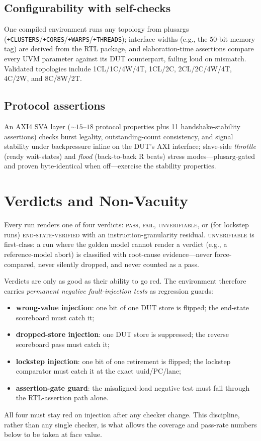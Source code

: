 \documentclass[conference]{IEEEtran}
\newcommand{\code}[1]{\texttt{\small #1}}
\begin{document}
\subsection{Configurability with self-checks}
One compiled environment runs any topology from plusargs
(\code{+CLUSTERS}/\code{+CORES}/\code{+WARPS}/\code{+THREADS});
interface widths (e.g., the 50-bit memory tag) are derived from the RTL
package, and elaboration-time assertions compare every UVM parameter
against its DUT counterpart, failing loud on mismatch. Validated
topologies include 1CL/1C/4W/4T, 1CL/2C, 2CL/2C/4W/4T, 4C/2W, and
8C/8W/2T.

\subsection{Protocol assertions}
An AXI4 SVA layer (${\sim}15$--$18$ protocol properties plus 11
handshake-stability assertions) checks burst legality,
outstanding-count consistency, and signal stability under backpressure
inline on the DUT's AXI interface; slave-side \emph{throttle}
(ready wait-states) and \emph{flood} (back-to-back R beats) stress
modes---plusarg-gated and proven byte-identical when off---exercise the
stability properties.

\section{Verdicts and Non-Vacuity}
\label{sec:verdicts}

Every run renders one of four verdicts: \textsc{pass},
\textsc{fail}, \textsc{unverifiable}, or (for lockstep runs)
\textsc{end-state-verified} with an instruction-granularity residual.
\textsc{unverifiable} is first-class: a run where the golden model
cannot render a verdict (e.g., a reference-model abort) is classified
with root-cause evidence---never force-compared, never silently
dropped, and never counted as a pass.

Verdicts are only as good as their ability to go red. The environment
therefore carries \emph{permanent negative fault-injection tests} as
regression guards:
\begin{itemize}
\item \textbf{wrong-value injection}: one bit of one DUT store is
flipped; the end-state scoreboard must catch it;
\item \textbf{dropped-store injection}: one DUT store is suppressed;
the reverse scoreboard pass must catch it;
\item \textbf{lockstep injection}: one bit of one retirement is
flipped; the lockstep comparator must catch it at the exact
uuid/PC/lane;
\item \textbf{assertion-gate guard}: the misaligned-load negative test
must fail through the RTL-assertion path alone.
\end{itemize}
All four must stay red on injection after any checker change. This
discipline, rather than any single checker, is what allows the coverage
and pass-rate numbers below to be taken at face value.
\end{document}
